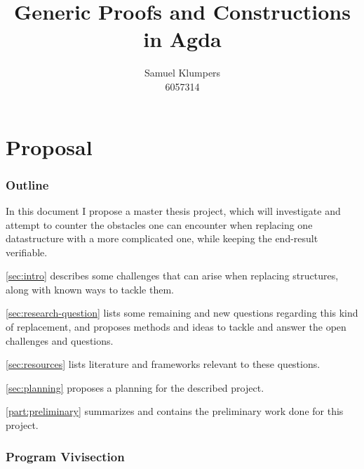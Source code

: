 \documentclass{article}
\title{Generic Proofs and Constructions in Agda}
\author{Samuel Klumpers\\6057314}
\theoremstyle{plain}%
\theoremstyle{definition}
\begin{document}
\maketitle
\tableofcontents

\newpage

\begin{comment}
\begin{abstract} %
    This thesis introduces the concepts of the structure identity principle, numerical representations, and ornamentations, and aims to combine these to simplify the presentation and verification of finger trees, demonstrating the generalizability and improved compactness and security of the resulting code. 
\end{abstract}
\end{comment}

\part{Proposal}
\section{Outline}
In this document I propose a master thesis project, which will investigate and attempt to counter the obstacles one can encounter when replacing one datastructure with a more complicated one, while keeping the end-result verifiable.

\autoref{sec:intro} describes some challenges that can arise when replacing structures, along with known ways to tackle them.

\autoref{sec:research-question} lists some remaining and new questions regarding this kind of replacement, and proposes methods and ideas to tackle and answer the open challenges and questions.

\autoref{sec:resources} lists literature and frameworks relevant to these questions.

\autoref{sec:planning} proposes a planning for the described project.

\autoref{part:preliminary} summarizes and contains the preliminary work done for this project.

\section{Program Vivisection}\label{sec:intro}

\end{document}
